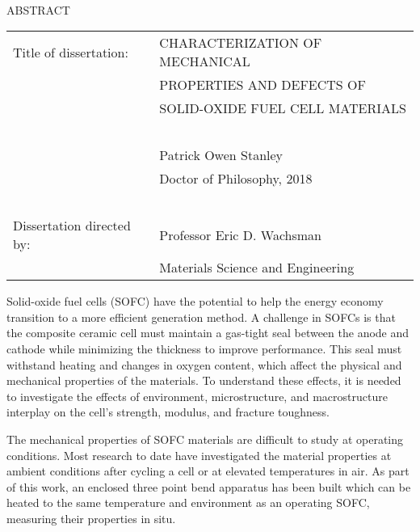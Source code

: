 
\hbox{\ }

\renewcommand{\baselinestretch}{1}
\small \normalsize

\begin{center}
\large{{ABSTRACT}}

\vspace{3em}

\end{center}
\hspace{-.15in}
\begin{tabular}{ll}
Title of dissertation:    & {\large  CHARACTERIZATION OF MECHANICAL}\\
&				      {\large  PROPERTIES AND DEFECTS OF  } \\
&				      {\large  SOLID-OXIDE FUEL CELL MATERIALS } \\
\ \\
&                          {\large  Patrick Owen Stanley} \\
&                           {\large Doctor of Philosophy, 2018}\\
\ \\
Dissertation directed by: & {\large  Professor Eric D. Wachsman} \\
&  				{\large	 Materials Science and Engineering } \\
\end{tabular}

\vspace{3em}

\renewcommand{\baselinestretch}{2}
\large \normalsize


Solid-oxide fuel cells (SOFC) have the potential to help the energy economy transition to a more efficient generation method.
A challenge in SOFCs is that the composite ceramic cell must maintain a gas-tight seal between the anode and cathode while minimizing the thickness to improve performance.
This seal must withstand heating and changes in oxygen content, which affect the physical and mechanical properties of the materials.
To understand these effects, it is needed to investigate the effects of environment, microstructure, and macrostructure interplay on the cell’s strength, modulus, and fracture toughness.

The mechanical properties of SOFC materials are difficult to study at operating conditions.
Most research to date have investigated the material properties at ambient conditions after cycling a cell or at elevated temperatures in air.
As part of this work, an enclosed three point bend apparatus has been built which can be heated to the same temperature and environment as an operating SOFC, measuring their properties in situ.

